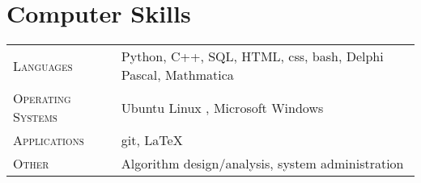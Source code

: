 
\section{Computer Skills}

\begin{tabular}{R{2.5cm}|l}
\textsc{Languages} & Python, C++, SQL, HTML, css, bash, Delphi Pascal, Mathmatica \\
\textsc{Operating Systems} & Ubuntu Linux , Microsoft Windows\\
\textsc{Applications} & git, \LaTeX \\
\textsc{Other} & Algorithm design/analysis, system administration
\end{tabular}

